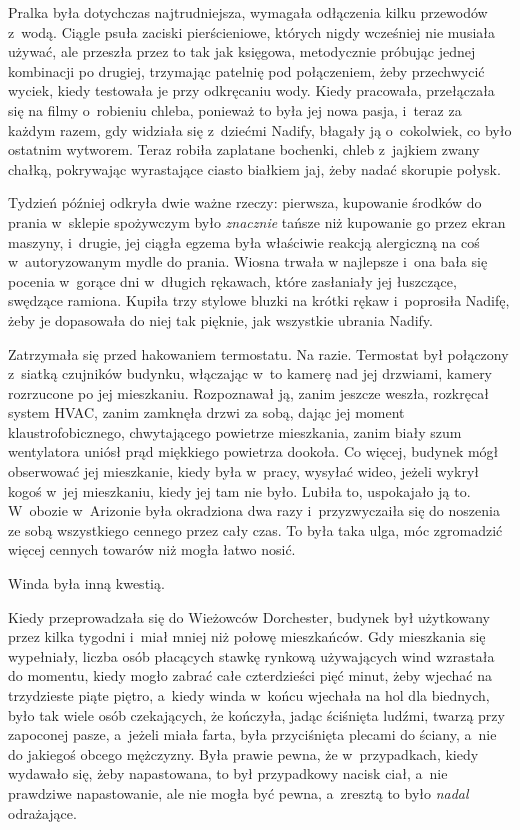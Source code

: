 \documentclass[oneside,polish,11pt,sfheadings]{mwbk}
\begin{document}
Pralka była dotychczas najtrudniejsza, wymagała odłączenia kilku
przewodów z~wodą. Ciągle psuła zaciski pierścieniowe, których nigdy
wcześniej nie musiała używać, ale przeszła przez to tak jak księgowa,
metodycznie próbując jednej kombinacji po drugiej, trzymając patelnię
pod połączeniem, żeby przechwycić wyciek, kiedy testowała je przy
odkręcaniu wody. Kiedy pracowała, przełączała się na filmy o~robieniu
chleba, ponieważ to była jej nowa pasja, i~teraz za każdym razem, gdy
widziała się z~dziećmi Nadify, błagały ją o~cokolwiek, co było ostatnim
wytworem. Teraz robiła zaplatane bochenki, chleb z~jajkiem zwany chałką,
pokrywając wyrastające ciasto białkiem jaj, żeby nadać skorupie połysk.

Tydzień później odkryła dwie ważne rzeczy: pierwsza, kupowanie środków
do prania w~sklepie spożywczym było \textit{znacznie} tańsze niż kupowanie
go przez ekran maszyny, i~drugie, jej ciągła egzema była właściwie
reakcją alergiczną na coś w~autoryzowanym mydle do prania. Wiosna trwała
w najlepsze i~ona bała się pocenia w~gorące dni w~długich rękawach,
które zasłaniały jej łuszczące, swędzące ramiona. Kupiła trzy stylowe
bluzki na krótki rękaw i~poprosiła Nadifę, żeby je dopasowała do niej
tak pięknie, jak wszystkie ubrania Nadify.

Zatrzymała się przed hakowaniem termostatu. Na razie. Termostat był
połączony z~siatką czujników budynku, włączając w~to kamerę nad jej
drzwiami, kamery rozrzucone po jej mieszkaniu. Rozpoznawał ją, zanim
jeszcze weszła, rozkręcał system HVAC, zanim zamknęła drzwi za sobą,
dając jej moment klaustrofobicznego, chwytającego powietrze mieszkania,
zanim biały szum wentylatora uniósł prąd miękkiego powietrza dookoła. Co
więcej, budynek mógł obserwować jej mieszkanie, kiedy była w~pracy,
wysyłać wideo, jeżeli wykrył kogoś w~jej mieszkaniu, kiedy jej tam nie
było. Lubiła to, uspokajało ją to. W~obozie w~Arizonie była okradziona
dwa razy i~przyzwyczaiła się do noszenia ze sobą wszystkiego cennego
przez cały czas. To była taka ulga, móc zgromadzić więcej cennych
towarów niż mogła łatwo nosić.

Winda była inną kwestią.

Kiedy przeprowadzała się do Wieżowców Dorchester, budynek był użytkowany
przez kilka tygodni i~miał mniej niż połowę mieszkańców. Gdy mieszkania
się wypełniały, liczba osób płacących stawkę rynkową używających wind
wzrastała do momentu, kiedy mogło zabrać całe czterdzieści pięć minut,
żeby wjechać na trzydzieste piąte piętro, a~kiedy winda w~końcu wjechała
na hol dla biednych, było tak wiele osób czekających, że kończyła, jadąc
ściśnięta ludźmi, twarzą przy zapoconej pasze, a~jeżeli miała farta,
była przyciśnięta plecami do ściany, a~nie do jakiegoś obcego mężczyzny.
Była prawie pewna, że w~przypadkach, kiedy wydawało się, żeby
napastowana, to był przypadkowy nacisk ciał, a~nie prawdziwe
napastowanie, ale nie mogła być pewna, a~zresztą to było \textit{nadal}
odrażające.
\end{document}
